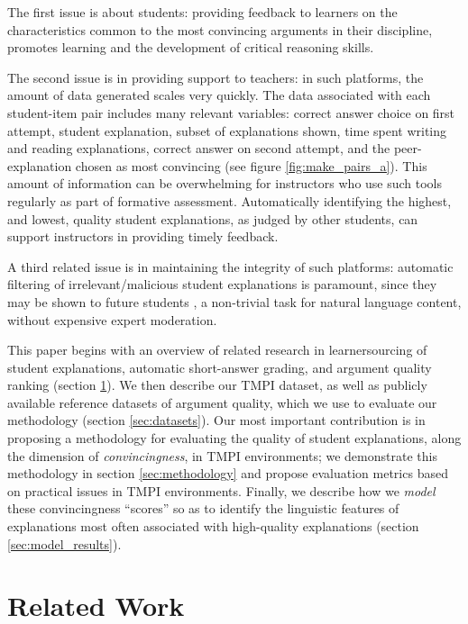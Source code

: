 \documentclass[notitlepage,12pt]{jedm}
\begin{document}
The first issue is about students: providing feedback to learners on the 
characteristics common to the most convincing arguments in their discipline, 
promotes learning and the development of critical reasoning skills.

The second issue is in providing support to teachers: in such platforms, the 
amount of data generated scales very quickly.
The data associated with each student-item pair includes many relevant 
variables: correct answer choice on first attempt, student explanation, subset 
of explanations shown, time spent writing and reading explanations, correct 
answer on second attempt, and the peer-explanation chosen as most convincing 
(see figure \ref{fig:make_pairs_a}).   
This amount of information can be overwhelming for instructors who use such 
tools regularly as part of formative assessment. 
Automatically identifying the highest, and lowest, quality student 
explanations, as judged by other students, can support instructors in providing 
timely feedback. 

A third related issue is in maintaining the integrity of such platforms: 
automatic filtering of irrelevant/malicious student explanations is paramount, 
since they may be shown to future students \cite{gagnon_filtering_2019}, a 
non-trivial task for natural language content, without expensive expert 
moderation.

This paper begins with an overview of related research in learnersourcing of 
student explanations, automatic short-answer grading, and argument quality 
ranking (section \ref{sec:related_work}).
We then describe our TMPI dataset, as well as publicly available reference 
datasets of argument quality, which we use to evaluate our methodology (section 
\ref{sec:datasets}).
Our most important contribution is in proposing a methodology for evaluating 
the quality of student explanations, along the dimension of 
\textit{convincingness}, in TMPI environments; we demonstrate this methodology 
in section \ref{sec:methodology} and propose evaluation metrics based on 
practical issues in TMPI environments.
Finally, we describe how we \textit{model} these convincingness ``scores'' so 
as to identify the linguistic features of explanations most often associated 
with high-quality explanations (section \ref{sec:model_results}).


\section{Related Work}\label{sec:related_work}
\end{document}
